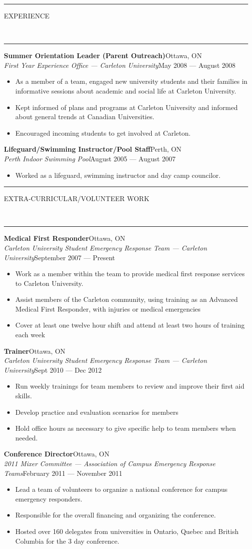 \documentclass[10pt, letterpaper, oneside]{article}
\newcommand{\HRule}[2]{\textcolor{#1}{\rule{\linewidth}{#2}}}
\newcommand{\sectiontitle}[1]{\begin{minipage}{\textwidth}\HRule{black}{0.25mm}\vspace{-10pt}\begin{center}\Large\MakeUppercase{#1}\end{center}\end{minipage}\\\HRule{light-grey}{0.15mm}\vspace{\baselineskip}}
\newenvironment{ressection}[1]{
  \sectiontitle{#1}}
  {\vspace{-\baselineskip}}
\newcommand{\resitem}[1]{
    \vspace{2pt}
    \item \begin{flushleft} #1 \end{flushleft}
}
\newcommand{\resentryheader}[4]{
    \vspace{-5pt}
    \textbf{#1}\hspace{\stretch{1}}\textcolor{light-grey}{#3}\\
    \textit{#2}\hspace{\stretch{1}}\textcolor{light-grey}{#4}\\
}
\newenvironment{resentry}[4]{
  \begin{minipage}{\textwidth}
    \resentryheader{#1}{#2}{#3}{#4}
        \vspace{-\baselineskip}
    \begin{itemize}[noitemsep,nolistsep]
}{
    \end{itemize}
        \vspace{\baselineskip}
        \end{minipage}
}
\begin{document}
\begin{ressection}{experience}
  \begin{resentry}{Summer Orientation Leader (Parent Outreach)}{First Year Experience Office --- Carleton University}{Ottawa, ON}{May 2008 --- August 2008}
    \resitem{As a member of a team, engaged new university students and their families in informative sessions about academic and social life at Carleton University.}
    \resitem{Kept informed of plans and programs at Carleton University and informed about general trends at 
Canadian Universities.}
    \resitem{Encouraged incoming students to get involved at Carleton.}
  \end{resentry}
 
  \begin{resentry}{Lifeguard/Swimming Instructor/Pool Staff}{Perth Indoor Swimming Pool}{Perth, ON}{August 2005 --- August 2007}
    \resitem{Worked as a lifeguard, swimming instructor and day camp councilor.}
  \end{resentry}
 
\end{ressection}
 
\begin{ressection}{Extra-Curricular/Volunteer work}
  \begin{resentry}{Medical First Responder}{Carleton University Student Emergency Response Team --- Carleton University}{Ottawa, ON}{September 2007 --- Present}
    \resitem{Work as a member within the team to provide medical first response services to Carleton University.}
    \resitem{Assist members of the Carleton community, using training as an Advanced Medical First Responder, with injuries or medical emergencies}
    \resitem{Cover at least one twelve hour shift and attend at least two hours of training each week}
  \end{resentry}
 
  \begin{resentry}{Trainer}{Carleton University Student Emergency Response Team --- Carleton University}{Ottawa, ON}{Sept 2010 --- Dec 2012}
    \resitem{Run weekly trainings for team members to review and improve their first aid skills.}
    \resitem{Develop practice and evaluation scenarios for members}
    \resitem{Hold office hours as necessary to give specific help to team members when needed.}
  \end{resentry}
 
  \begin{resentry}{Conference Director}{2011 Mixer Committee --- Association of Campus Emergency Response Teams}{Ottawa, ON}{February 2011 --- November 2011}
    \resitem{Lead a team of volunteers to organize a national conference for campus emergency responders.}
    \resitem{Responsible for the overall financing and organizing the conference.}
    \resitem{Hosted over 160 delegates from universities in Ontario, Quebec and British Columbia for the 3 day conference.}
  \end{resentry}
 
\end{ressection}
     
\end{document}
